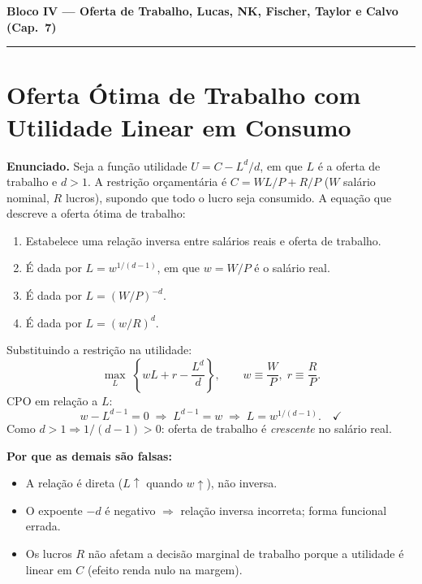 \documentclass[12pt, a4paper]{article}
\begin{document}
\newpage
\begin{center}
{\large\bfseries\color{cyanrbc}
  Bloco IV --- Oferta de Trabalho, Lucas, NK, Fischer, Taylor e Calvo (Cap.\ 7)}\\[0.2em]
\rule{\linewidth}{0.6pt}
\end{center}

\section{Oferta Ótima de Trabalho com Utilidade Linear em Consumo}

\textbf{Enunciado.} Seja a função utilidade $U = C - L^d/d$, em que $L$ é a oferta de trabalho e $d > 1$. A restrição orçamentária é $C = WL/P + R/P$ ($W$ salário nominal, $R$ lucros), supondo que todo o lucro seja consumido. A equação que descreve a oferta ótima de trabalho:

\begin{enumerate}[label=\alph*)]
\item Estabelece uma relação inversa entre salários reais e oferta de trabalho.
\item É dada por $L = w^{1/(d-1)}$, em que $w = W/P$ é o salário real.
\item É dada por $L = (W/P)^{-d}$.
\item É dada por $L = (w/R)^d$.
\end{enumerate}

\begin{correctbox}[title={Resposta correta: b)}]
Substituindo a restrição na utilidade:
\[
\max_L \;\left\{wL + r - \frac{L^d}{d}\right\}, \qquad w \equiv \frac{W}{P},\; r \equiv \frac{R}{P}.
\]
CPO em relação a $L$:
\[
w - L^{d-1} = 0 \;\Longrightarrow\; L^{d-1} = w
  \;\Longrightarrow\; \boxed{L = w^{1/(d-1)}}. \quad\checkmark
\]
Como $d > 1 \Rightarrow 1/(d-1) > 0$: oferta de trabalho é \emph{crescente} no salário real.

\textbf{Por que as demais são falsas:}
\begin{itemize}[leftmargin=*]
\item[a)] A relação é direta ($L\uparrow$ quando $w\uparrow$), não inversa.
\item[c)] O expoente $-d$ é negativo $\Rightarrow$ relação inversa incorreta; forma funcional errada.
\item[d)] Os lucros $R$ não afetam a decisão marginal de trabalho porque a utilidade é linear em $C$
(efeito renda nulo na margem).
\end{itemize}
\end{correctbox}
\end{document}
